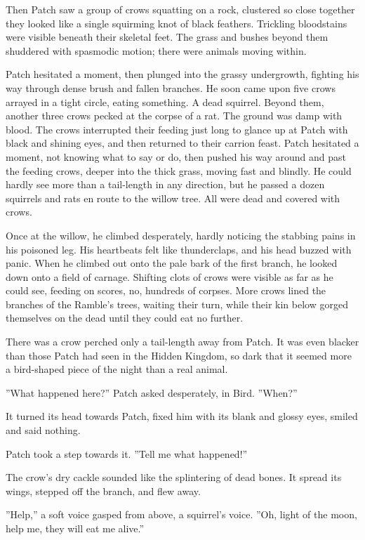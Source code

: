 \documentclass[12pt]{book}
\begin{document}
Then Patch saw a group of crows squatting on a rock, clustered so close together they looked like a single squirming knot of black feathers. Trickling bloodstains were visible beneath their skeletal feet. The grass and bushes beyond them shuddered with spasmodic motion; there were animals moving within.

Patch hesitated a moment, then plunged into the grassy undergrowth, fighting his way through dense brush and fallen branches. He soon came upon five crows arrayed in a tight circle, eating something. A dead squirrel. Beyond them, another three crows pecked at the corpse of a rat. The ground was damp with blood. The crows interrupted their feeding just long to glance up at Patch with black and shining eyes, and then returned to their carrion feast. Patch hesitated a moment, not knowing what to say or do, then pushed his way around and past the feeding crows, deeper into the thick grass, moving fast and blindly. He could hardly see more than a tail-length in any direction, but he passed a dozen squirrels and rats en route to the willow tree. All were dead and covered with crows.

Once at the willow, he climbed desperately, hardly noticing the stabbing pains in his poisoned leg. His heartbeats felt like thunderclaps, and his head buzzed with panic. When he climbed out onto the pale bark of the first branch, he looked down onto a field of carnage. Shifting clots of crows were visible as far as he could see, feeding on scores, no, hundreds of corpses. More crows lined the branches of the Ramble's trees, waiting their turn, while their kin below gorged themselves on the dead until they could eat no further.

There was a crow perched only a tail-length away from Patch. It was even blacker than those Patch had seen in the Hidden Kingdom, so dark that it seemed more a bird-shaped piece of the night than a real animal.

''What happened here?'' Patch asked desperately, in Bird. ''When?''

It turned its head towards Patch, fixed him with its blank and glossy eyes, smiled and said nothing.

Patch took a step towards it. ''Tell me what happened!''

The crow's dry cackle sounded like the splintering of dead bones. It spread its wings, stepped off the branch, and flew away.

''Help,'' a soft voice gasped from above, a squirrel's voice. ''Oh, light of the moon, help me, they will eat me alive.''
\end{document}
